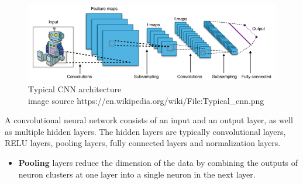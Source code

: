 \begin{figure}[h]
	\centering
	\caption[Typical convolutional neural network architecture]{Typical CNN architecture
		\\ image source https://en.wikipedia.org/wiki/File:Typical\_cnn.png}
	\label{fig:cnn}
	\includegraphics[width=1.1\textwidth, height=1.5\textheight, keepaspectratio]{"resources/typical_cnn"}
\end{figure}

\par
A convolutional neural network consists of an input and an output layer, as well as multiple hidden layers. The hidden layers are typically convolutional layers, RELU layers, pooling layers, fully connected layers and normalization layers. \cite{cnn_git}

\begin{itemize}
	\item \textbf{Pooling} layers reduce the dimension of the data by combining the outputs of neuron clusters at one layer into a single neuron in the next layer. 
\end{itemize}


